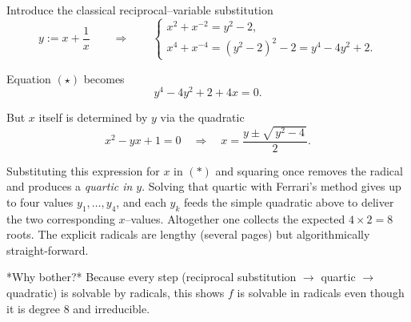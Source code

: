 \documentclass[12pt]{article}
\theoremstyle{definition} %
\theoremstyle{plain} %
\begin{document}
Introduce the classical reciprocal–variable substitution
\[
y:=x+\frac1x \qquad\Longrightarrow\qquad
\begin{cases}
x^{2}+x^{-2}=y^{2}-2,\\[6pt]
x^{4}+x^{-4}=(y^{2}-2)^{2}-2=y^{4}-4y^{2}+2.
\end{cases}
\]

Equation $(\star)$ becomes  
\[
y^{4}-4y^{2}+2+4x=0.
\tag{$\ast$}
\]

But $x$ itself is determined by $y$ via the quadratic
\[
x^{2}-yx+1=0
\quad\Longrightarrow\quad
x=\dfrac{y\pm\sqrt{\,y^{2}-4\,}}{2}.
\]

Substituting this expression for $x$ in $(\ast)$ and squaring once removes the
radical and produces a \emph{quartic in $y$}.  Solving that quartic with
Ferrari’s method gives up to four values $y_{1},\dots,y_{4}$, and each $y_{k}$
feeds the simple quadratic above to deliver the two corresponding $x$–values.
Altogether one collects the expected $4\times2=8$ roots.
The explicit radicals are lengthy (several pages) but algorithmically
straight-forward.

*Why bother?*  
Because every step (reciprocal substitution $\to$ quartic $\to$ quadratic)
is solvable by radicals, this shows \(f\) is solvable in radicals even though it
is degree 8 and irreducible.
\end{document}
